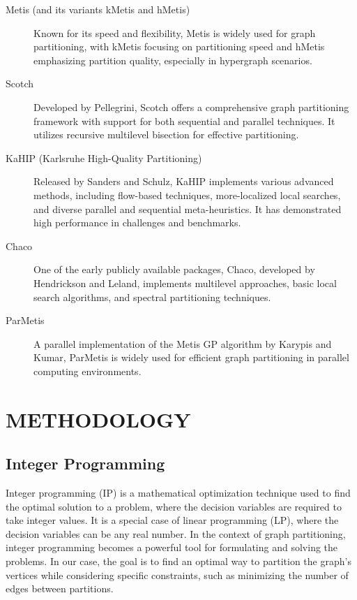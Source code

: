 \documentclass[a4paper,12pt]{report}
\begin{document}
\begin{description}
  \item[Metis (and its variants kMetis and hMetis)] Known for its speed and flexibility, Metis is widely used for graph partitioning, with kMetis focusing on partitioning speed and hMetis emphasizing partition quality, especially in hypergraph scenarios.

  \item[Scotch] Developed by Pellegrini, Scotch offers a comprehensive graph partitioning framework with support for both sequential and parallel techniques. It utilizes recursive multilevel bisection for effective partitioning.

  \item[KaHIP (Karlsruhe High-Quality Partitioning)] Released by Sanders and Schulz, KaHIP implements various advanced methods, including flow-based techniques, more-localized local searches, and diverse parallel and sequential meta-heuristics. It has demonstrated high performance in challenges and benchmarks.

  \item[Chaco] One of the early publicly available packages, Chaco, developed by Hendrickson and Leland, implements multilevel approaches, basic local search algorithms, and spectral partitioning techniques.

  \item[ParMetis] A parallel implementation of the Metis GP algorithm by Karypis and Kumar, ParMetis is widely used for efficient graph partitioning in parallel computing environments.
\end{description}

\chapter{METHODOLOGY}

\section{Integer Programming}
Integer programming (IP) is a mathematical optimization technique used to find the optimal solution to a problem, where the decision variables are required to take integer values. It is a special case of linear programming (LP), where the decision variables can be any real number. In the context of graph partitioning, integer programming becomes a powerful tool for formulating and solving the problems. In our case, the goal is to find an optimal way to partition the graph's vertices while considering specific constraints, such as minimizing the number of edges between partitions.
\end{document}
